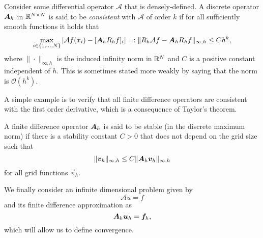 \begin{definition}[Consistency]
    Consider some differential operator $\mathcal A$ that is densely-defined. A discrete operator $\mat A_h$ in $\mathbb{R}^{N\times N}$ is said to be \emph{consistent} with $\mathcal A$ of order $k$ if for all sufficiently smooth functions it holds that
    \begin{equation}\label{def:consistency}
        \max_{i\in\{1,\hdots,N\}}|\mathcal Af(x_i) - [\mat A_h R_h f]_i| =: \|R_h \mathcal Af - \mat A_hR_h f\|_{\infty,h} \leq C h^k,
    \end{equation}
    where $\|\cdot \|_{\infty,h}$ is the induced infinity norm in $\mathbb{R}^N$ and $C$ is a positive constant independent of $h$. This is sometimes stated more weakly by saying that the norm is $\mathcal O(h^k)$. 
\end{definition}

A simple example is to verify that all finite difference operators are consistent with the first order derivative, which is a consequence of Taylor's theorem.
\begin{definition}[Stability]
    A finite difference operator $\mat A_h$ is said to be stable (in the discrete maximum norm) if there is a stability constant $C>0$ that does not depend on the grid size such that
        \begin{equation}\label{def:stability}
            \| \vec v_h \|_{\infty,h} \leq C \|\mat A_h \vec v_h \|_{\infty,h}
        \end{equation}
        for all grid functions $\vec v_h$. 
\end{definition}
We finally consider an infinite dimensional problem given by
    \begin{equation}
        \mathcal A u = f
    \end{equation}
and its finite difference approximation as
    \begin{equation}\label{def:fd-approx}
        \mat A_h \vec u_h = \vec f_h,
    \end{equation}
which will allow us to define convergence. 


